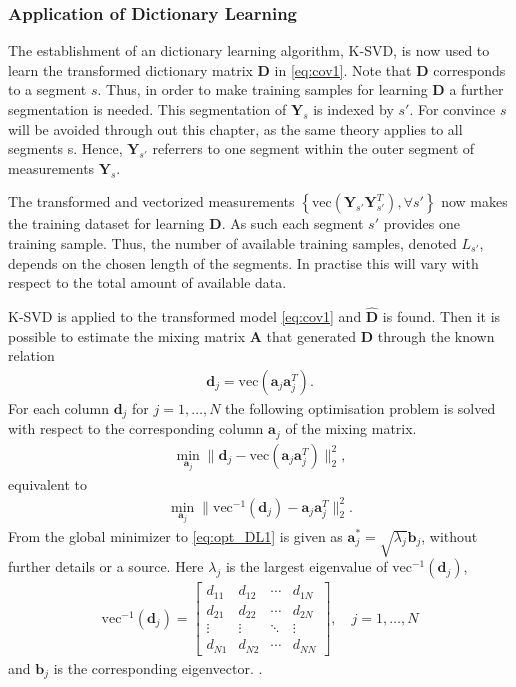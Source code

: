 \subsubsection{Application of Dictionary Learning}
The establishment of an dictionary learning algorithm, K-SVD, is now used to learn the transformed dictionary matrix $\textbf{D}$ in \eqref{eq:cov1}. 
Note that $\textbf{D}$ corresponds to a segment $s$. Thus, in order to make training samples for learning $\textbf{D}$ a further segmentation is needed.
This segmentation of $\textbf{Y}_s$ is indexed by $s'$. For convince $s$ will be avoided through out this chapter, as the same theory applies to all segments s. Hence, $\textbf{Y}_{s'}$ referrers to one segment within the outer segment of measurements $\textbf{Y}_s$.
   
The transformed and vectorized measurements $\left\{ \text{vec}\left( \mathbf{Y}_{s'} \mathbf{Y}_{s'}^T \right), \forall s' \right\}$ now makes the training dataset for learning $\textbf{D}$. 
As such each segment $s'$ provides one training sample.   
Thus, the number of available training samples, denoted $L_{s'}$, depends on the chosen length of the segments. In practise this will vary with respect to the total amount of available data. 

K-SVD is applied to the transformed model \eqref{eq:cov1} and $\hat{\mathbf{D}}$ is found. Then it is possible to estimate the mixing matrix $\mathbf{A}$ that generated $\textbf{D}$ through the known relation 
\begin{align*}
\mathbf{d}_j = \text{vec}(\mathbf{a}_j \mathbf{a}_j^T).
\end{align*}
For each column $\textbf{d}_j$ for $j=1,\hdots,N$ the following optimisation problem is solved with respect to the corresponding column $\textbf{a}_j$ of the mixing matrix.
\begin{align*}
\min_{\textbf{a}_j} \| \textbf{d}_j -\text{vec}\left(\textbf{a}_j\textbf{a}_j^T\right) \|_2^2, 
\end{align*}
equivalent to 
\begin{align}
\min_{\textbf{a}_j} \| \text{vec}^{-1}(\textbf{d}_j) -\textbf{a}_j\textbf{a}_j^T\|_2^2. \label{eq:opt_DL1}
\end{align}
From \cite{Balkan2015} the global minimizer to \eqref{eq:opt_DL1} is given as $\mathbf{a}^{\ast}_j=\sqrt{\lambda_j} \textbf{b}_j$, without further details or a source.  
Here $\lambda_j$ is the largest eigenvalue of $\text{vec}^{-1}(\textbf{d}_j)$,
\begin{align*}
\text{vec}^{-1}(\textbf{d}_j) = 
\begin{bmatrix}
d_{11} & d_{12} & \cdots & d_{1N} \\
d_{21} & d_{22} & \cdots & d_{2N} \\
\vdots & \vdots & \ddots & \vdots \\
d_{N1} & d_{N2} & \cdots & d_{NN}
\end{bmatrix}, \quad j =1,\hdots,N
\end{align*}
and $\textbf{b}_j$ is the corresponding eigenvector.
.

